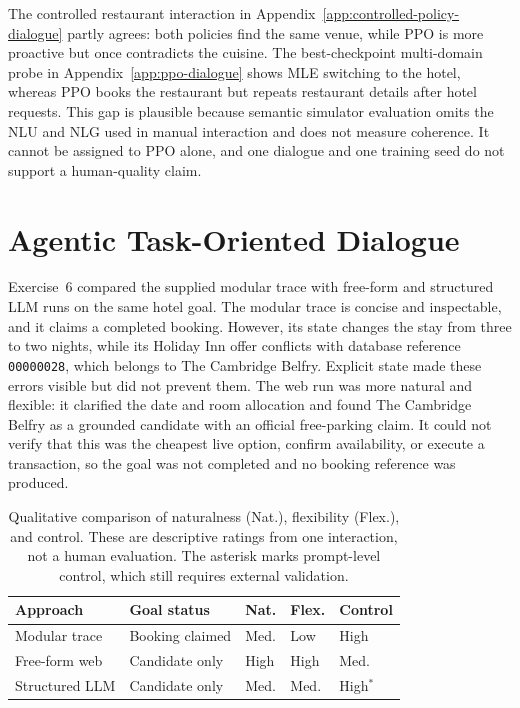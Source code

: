 \documentclass[11pt]{article}
\begin{document}
The controlled restaurant interaction in
Appendix~\ref{app:controlled-policy-dialogue} partly agrees: both policies find
the same venue, while PPO is more proactive but once contradicts the cuisine.
The best-checkpoint multi-domain probe in Appendix~\ref{app:ppo-dialogue} shows
MLE switching to the hotel, whereas PPO books the restaurant but repeats
restaurant details after hotel requests. This gap is plausible because semantic
simulator evaluation omits the NLU and NLG used in manual interaction and does
not measure coherence. It cannot be assigned to PPO alone, and one dialogue and
one training seed do not support a human-quality claim.

\section{Agentic Task-Oriented Dialogue}\label{sec:agentic}

Exercise~6 compared the supplied modular trace with free-form and structured
LLM runs on the same hotel goal. The modular trace is concise and inspectable,
and it claims a completed booking. However, its state changes the stay from
three to two nights, while its Holiday Inn offer conflicts with database
reference \texttt{00000028}, which belongs to The Cambridge Belfry. Explicit
state made these errors visible but did not prevent them. The web run was more
natural and flexible: it clarified the date and room allocation and found The
Cambridge Belfry as a grounded candidate with an official free-parking claim.
It could not verify that this was the cheapest live option, confirm
availability, or execute a transaction, so the goal was not completed and no
booking reference was produced.

\begin{table}[H]
  \centering
  \scriptsize
  \setlength{\tabcolsep}{2.5pt}
  \begin{tabular}{@{}
    >{\raggedright\arraybackslash}p{}
    >{\raggedright\arraybackslash}p{}
    >{\centering\arraybackslash}p{}
    >{\centering\arraybackslash}p{}
    >{\centering\arraybackslash}p{}@{}}
    \toprule
    \textbf{Approach} & \textbf{Goal status} & \textbf{Nat.} & \textbf{Flex.} & \textbf{Control} \\
    \midrule
    Modular trace & Booking claimed & Med. & Low & High \\
    Free-form web & Candidate only & High & High & Med. \\
    Structured LLM & Candidate only & Med. & Med. & High$^{*}$ \\
    \bottomrule
  \end{tabular}
  \caption{Qualitative comparison of naturalness (Nat.), flexibility (Flex.),
  and control. These are descriptive ratings from one interaction, not a human
  evaluation. The asterisk marks prompt-level control, which still requires
  external validation.}
  \label{tab:llm-comparison}
\end{table}
\end{document}
